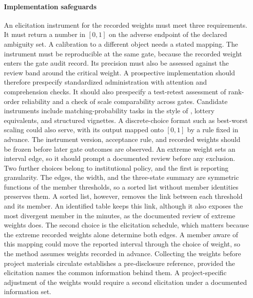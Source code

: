 \paragraph{Implementation safeguards} An elicitation instrument for the recorded weights must meet three requirements. It must return a number in $[0,1]$ on the adverse endpoint of the declared ambiguity set. A calibration to a different object needs a stated mapping. The instrument must be reproducible at the same gate, because the recorded weight enters the gate audit record. Its precision must also be assessed against the review band around the critical weight. A prospective implementation should therefore prespecify standardized administration with attention and comprehension checks. It should also prespecify a test-retest assessment of rank-order reliability and a check of scale comparability across gates. Candidate instruments include matching-probability tasks in the style of \citet{Dimmock2016}, lottery equivalents, and structured vignettes. A discrete-choice format such as best-worst scaling could also serve, with its output mapped onto $[0,1]$ by a rule fixed in advance. The instrument version, acceptance rule, and recorded weights should be frozen before later gate outcomes are observed. An extreme weight sets an interval edge, so it should prompt a documented review before any exclusion. Two further choices belong to institutional policy, and the first is reporting granularity. The edges, the width, and the three-state summary are symmetric functions of the member thresholds, so a sorted list without member identities preserves them. A sorted list, however, removes the link between each threshold and its member. An identified table keeps this link, although it also exposes the most divergent member in the minutes, as the documented review of extreme weights does. The second choice is the elicitation schedule, which matters because the extreme recorded weights alone determine both edges. A member aware of this mapping could move the reported interval through the choice of weight, so the method assumes weights recorded in advance. Collecting the weights before project materials circulate establishes a pre-disclosure reference, provided the elicitation names the common information behind them. A project-specific adjustment of the weights would require a second elicitation under a documented information set.


